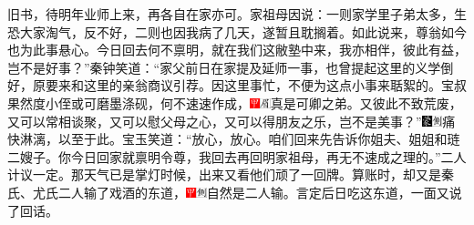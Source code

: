 旧书，待明年业师上来，再各自在家亦可。家祖母因说：一则家学里子弟太多，生恐大家淘气，反不好，二则也因我病了几天，遂暂且耽搁着。如此说来，尊翁如今也为此事悬心。今日回去何不禀明，就在我们这敝塾中来，我亦相伴，彼此有益，岂不是好事？''秦钟笑道：``家父前日在家提及延师一事，也曾提起这里的义学倒好，原要来和这里的亲翁商议引荐。因这里事忙，不便为这点小事来聒絮的。宝叔果然度小侄或可磨墨涤砚，何不速速作成，{\includegraphics[width=3mm]{../Images/00002}\includegraphics[width=3mm]{../Images/00010}\footnotesize \kaishu 真是可卿之弟。}又彼此不致荒废，又可以常相谈聚，又可以慰父母之心，又可以得朋友之乐，岂不是美事？''{\includegraphics[width=3mm]{../Images/00006}\includegraphics[width=3mm]{../Images/00011}\footnotesize \kaishu 痛快淋漓，以至于此。}宝玉笑道：``放心，放心。咱们回来先告诉你姐夫、姐姐和琏二嫂子。你今日回家就禀明令尊，我回去再回明家祖母，再无不速成之理的。''二人计议一定。那天气已是掌灯时候，出来又看他们顽了一回牌。算账时，却又是秦氏、尤氏二人输了戏酒的东道，{\includegraphics[width=3mm]{../Images/00002}\includegraphics[width=3mm]{../Images/00011}\footnotesize \kaishu 自然是二人输。}言定后日吃这东道，一面又说了回话。

